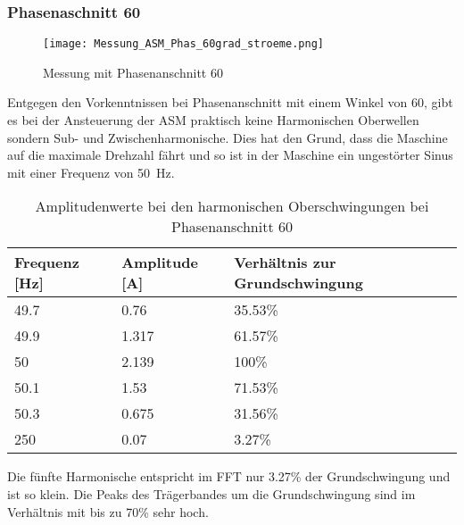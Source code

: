 \subsubsection*{Phasenaschnitt 60\textdegree}
\begin{figure}[ht!]
	\centering
	\texttt{[image: Messung\_ASM\_Phas\_60grad\_stroeme.png]}	
	\caption{Messung mit Phasenanschnitt 60\textdegree}\label{fig:Mess_Phas_60grad_stroeme}
\end{figure}
Entgegen den Vorkenntnissen bei Phasenanschnitt mit einem Winkel von 60\textdegree, gibt es bei der Ansteuerung der ASM praktisch keine Harmonischen Oberwellen sondern Sub- und Zwischenharmonische. Dies hat den Grund, dass die Maschine auf die maximale Drehzahl fährt und so ist in der Maschine ein ungestörter Sinus mit einer Frequenz von \SI{50}{Hz}.

\begin{table}[ht!]
	\centering
	\begin{tabular}{|l|l|l|}
		\hline
		Frequenz {[}Hz{]} & Amplitude {[}A{]} & Verhältnis zur Grundschwingung	\\ \hline
		49.7              & 0.76              & 35.53\%							\\ \hline
		49.9              & 1.317             & 61.57\%							\\ \hline
		50                & 2.139             & 100\%							\\ \hline
		50.1              & 1.53              & 71.53\%							\\ \hline
		50.3              & 0.675             & 31.56\%							\\ \hline
		250               & 0.07              & 3.27\%							\\ \hline
	\end{tabular}
	\caption{Amplitudenwerte bei den harmonischen Oberschwingungen bei Phasenanschnitt 60\textdegree}\label{tab:Phas_60_ASM_stroeme}
\end{table}

Die fünfte Harmonische entspricht im FFT nur 3.27\% der Grundschwingung und ist so klein. Die Peaks des Trägerbandes um die Grundschwingung sind im Verhältnis mit bis zu 70\% sehr hoch.

\newpage
